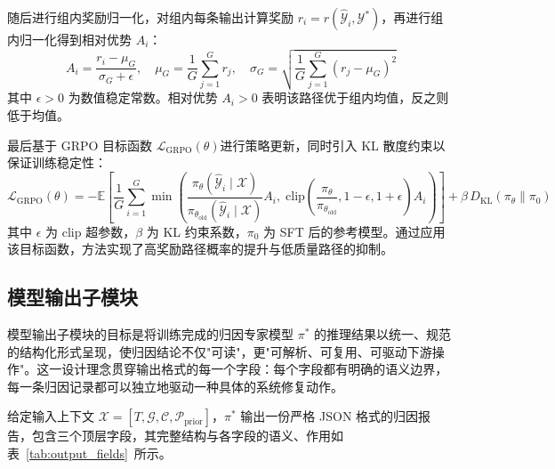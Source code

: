 随后进行组内奖励归一化，对组内每条输出计算奖励 $r_i = r(\hat{\mathcal{Y}}_i, \mathcal{Y}^*)$，再进行组内归一化得到相对优势 $A_i$：
\begin{equation}
  A_i = \frac{r_i - \mu_G}{\sigma_G + \epsilon}, \quad
  \mu_G = \frac{1}{G}\sum_{j=1}^G r_j, \quad
  \sigma_G = \sqrt{\frac{1}{G}\sum_{j=1}^G (r_j - \mu_G)^2}
\end{equation}
其中 $\epsilon > 0$ 为数值稳定常数。相对优势 $A_i > 0$ 表明该路径优于组内均值，反之则低于均值。
 
最后基于 GRPO 目标函数 $\mathcal{L}_{\text{GRPO}}(\theta)$进行策略更新，同时引入 KL 散度约束以保证训练稳定性：
\begin{equation}
  \mathcal{L}_{\text{GRPO}}(\theta) = -\mathbb{E}\!\left[\frac{1}{G}\sum_{i=1}^G \min\!\left(
    \frac{\pi_\theta(\hat{\mathcal{Y}}_i \mid \mathcal{X})}{\pi_{\theta_{\text{old}}}(\hat{\mathcal{Y}}_i \mid \mathcal{X})} A_i,\;
    \text{clip}\!\left(\frac{\pi_\theta}{\pi_{\theta_{\text{old}}}}, 1\!-\!\epsilon, 1\!+\!\epsilon\right) A_i
  \right)\right] + \beta\, D_{\text{KL}}(\pi_\theta \| \pi_0)
  \label{eq:grpo}
\end{equation}
其中 $\epsilon$ 为 clip 超参数，$\beta$ 为 KL 约束系数，$\pi_0$ 为 SFT 后的参考模型。通过应用该目标函数，方法实现了高奖励路径概率的提升与低质量路径的抑制。

\subsection{模型输出子模块}
模型输出子模块的目标是将训练完成的归因专家模型 $\pi^*$ 的推理结果以统一、规范的结构化形式呈现，使归因结论不仅"可读"，更"可解析、可复用、可驱动下游操作"。这一设计理念贯穿输出格式的每一个字段：每个字段都有明确的语义边界，每一条归因记录都可以独立地驱动一种具体的系统修复动作。
 
给定输入上下文 $\mathcal{X} = [T, \mathcal{G}, \mathcal{C}, \mathcal{P}_{\text{prior}}]$，$\pi^*$ 输出一份严格 JSON 格式的归因报告，包含三个顶层字段，其完整结构与各字段的语义、作用如表~\ref{tab:output_fields}~所示。
 
